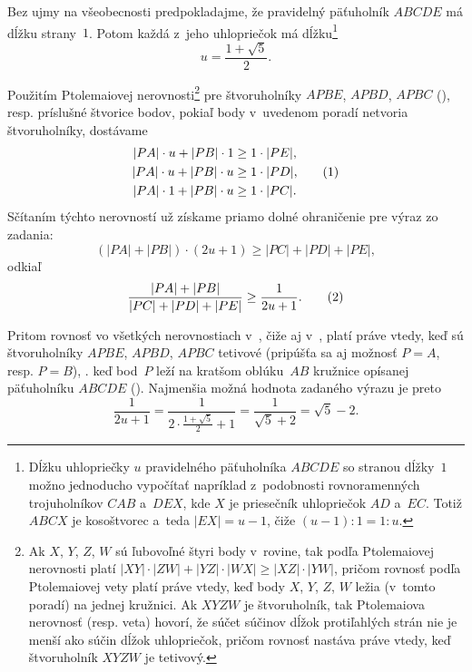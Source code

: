 {%
Bez ujmy na všeobecnosti predpokladajme, že pravidelný päťuholník $ABCDE$ má dĺžku strany~$1$. Potom každá z~jeho uhlopriečok má dĺžku\footnote{Dĺžku uhlopriečky $u$ pravidelného päťuholníka $ABCDE$ so stranou dĺžky~$1$ možno jednoducho vypočítať napríklad z~podobnosti rovnoramenných trojuholníkov $CAB$ a~$DEX$, kde $X$ je priesečník uhlopriečok $AD$ a~$EC$. Totiž $ABCX$ je kosoštvorec a~teda $|EX|=u-1$, čiže $(u-1):1=1:u$.}
$$
u=\frac{1+\sqrt5}2.
$$

Použitím Ptolemaiovej nerovnosti\footnote{Ak $X$, $Y$, $Z$, $W$ sú ľubovoľné štyri body v~rovine, tak podľa Ptolemaiovej nerovnosti platí $|XY|\cdot|ZW|+|YZ|\cdot|WX|\ge|XZ|\cdot|YW|$, pričom rovnosť podľa Ptolemaiovej vety platí práve vtedy, keď body $X$, $Y$, $Z$, $W$ ležia (v~tomto poradí) na jednej kružnici. Ak $XYZW$ je štvoruholník, tak Ptolemaiova nerovnosť (resp. veta) hovorí, že súčet súčinov dĺžok protiľahlých strán nie je menší ako súčin dĺžok uhlopriečok, pričom rovnosť nastáva práve vtedy, keď štvoruholník $XYZW$ je tetivový.} pre štvoruholníky $APBE$, $APBD$, $APBC$ (\obr), resp. príslušné štvorice bodov, pokiaľ body v~uvedenom poradí netvoria štvoruholníky, dostávame
$$
\aligned
|PA|\cdot u+|PB|\cdot 1 &\ge 1\cdot|PE|,\\
|PA|\cdot u+|PB|\cdot u &\ge 1\cdot|PD|,\\
|PA|\cdot 1+|PB|\cdot u &\ge 1\cdot|PC|.
\endaligned
\tag1
$$
Sčítaním týchto nerovností už získame priamo dolné ohraničenie pre výraz zo zadania:
$$
(|PA|+|PB|)\cdot(2u+1)\ge|PC|+|PD|+|PE|,
$$
odkiaľ
$$
\frac{|PA|+|PB|}{|PC|+|PD|+|PE|}\ge\frac1{2u+1}.
\tag2
$$
%

Pritom rovnosť vo všetkých nerovnostiach v~, čiže aj v~, platí práve vtedy, keď sú štvoruholníky $APBE$, $APBD$, $APBC$ tetivové (pripúšťa sa aj možnosť $P=A$, resp. $P=B$), \tj. keď bod~$P$ leží na kratšom oblúku~$AB$ kružnice opísanej päťuholníku $ABCDE$ (\obr). Najmenšia možná hodnota zadaného výrazu je preto
$$
\frac1{2u+1}=\frac1{2\cdot\frac{1+\sqrt5}2+1}=\frac1{\sqrt5+2}=\sqrt{5}-2.
$$}

